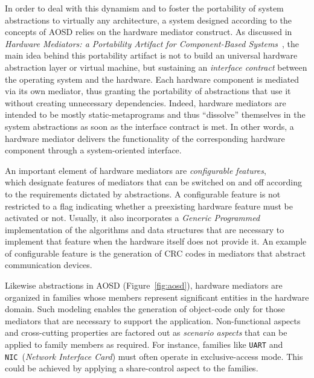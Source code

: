 \documentclass{kapproc} %
\begin{document}
 In order to deal with this dynamism and to foster the portability of
 system abstractions to virtually any architecture, a system designed
 according to the concepts of AOSD relies on the hardware mediator
 construct. As discussed in \emph{Hardware Mediators: a Portability
 Artifact for Component-Based Systems}~\cite{Polpeta:euc:2004}, the
 main idea behind this portability artifact is not to build an
 universal hardware abstraction layer or virtual machine, but
 sustaining an \emph{interface contract} between the operating system
 and the hardware. Each hardware component is mediated via its own
 mediator, thus granting the portability of abstractions that use it
 without creating unnecessary dependencies. Indeed, hardware mediators
 are intended to be mostly static-metaprograms and thus ``dissolve''
 themselves in the system abstractions as soon as the interface
 contract is met. In other words, a hardware mediator delivers the
 functionality of the corresponding hardware component through a
 system-oriented interface.

 An important element of hardware mediators are \emph{configurable
 features}, \\which designate features of mediators that can be switched
 on and off according to the requirements dictated by abstractions. A
 configurable feature is not restricted to a flag indicating whether a
 preexisting hardware feature must be activated or not. Usually, it
 also incorporates a \emph{Generic Programmed}~\cite{Musser:1989}
 implementation of the algorithms and data structures that are
 necessary to implement that feature when the hardware itself does not
 provide it. An example of configurable feature is the generation of
 CRC codes in mediators that abstract communication devices.

 Likewise abstractions in AOSD (Figure~\ref{fig:aosd}), hardware
 mediators are organized in families whose members represent
 significant entities in the hardware domain. Such modeling enables
 the generation of object-code only for those mediators that are
 necessary to support the application. Non-functional aspects and
 cross-cutting properties are factored out as \emph{scenario aspects}
 that can be applied to family members as required. For instance,
 families like \texttt{UART} and \texttt{NIC}~(\emph{Network Interface
 Card}) must often operate in exclusive-access mode. This could be
 achieved by applying a share-control aspect to the families.

\end{document}
